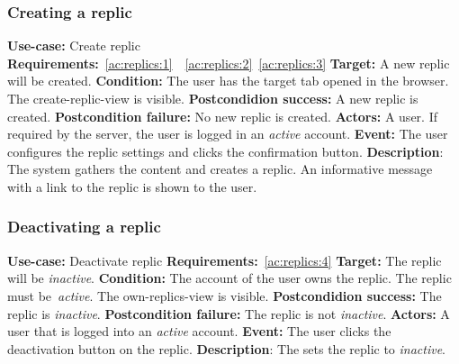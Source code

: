 \subsubsection{Creating a replic}\label{subsubsec:create-replic}
\textbf{Use-case:} Create replic \newline
\textbf{Requirements:}~\ref{ac:replics:1}~~\ref{ac:replics:2}~\ref{ac:replics:3} \newline
\textbf{Target:} A new replic will be created. \newline
\textbf{Condition:} The user has the target tab opened in the browser.
The create-replic-view is visible. \newline
\textbf{Postcondidion success:} A new replic is created. \newline
\textbf{Postcondition failure:} No new replic is created. \newline
\textbf{Actors:} A user.
If required by the server, the user is logged in an \textit{active} account. \newline
\textbf{Event:} The user configures the replic settings and clicks the confirmation button. \newline
\textbf{Description}: The system gathers the content and creates a replic.
An informative message with a link to the replic is shown to the user.

\subsubsection{Deactivating a replic}\label{subsubsec:deactivate-replic}
\textbf{Use-case:} Deactivate replic \newline
\textbf{Requirements:}~\ref{ac:replics:4} \newline
\textbf{Target:} The replic will be \textit{inactive}. \newline
\textbf{Condition:} The account of the user owns the replic.
The replic must be~\textit{active}.
The own-replics-view is visible. \newline
\textbf{Postcondidion success:} The replic is \textit{inactive}. \newline
\textbf{Postcondition failure:} The replic is not \textit{inactive}. \newline
\textbf{Actors:} A user that is logged into an \textit{active} account. \newline
\textbf{Event:} The user clicks the deactivation button on the replic. \newline
\textbf{Description}: The sets the replic to \textit{inactive}.

